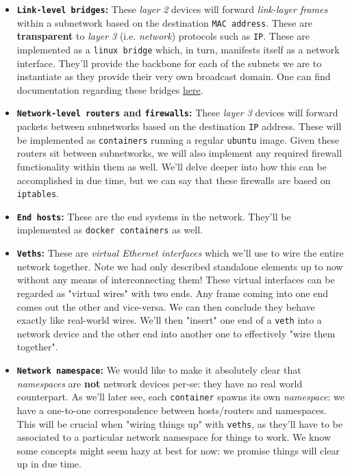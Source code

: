             \begin{itemize}
                \item \textbf{\texttt{Link-level bridges}:} These \textit{layer 2} devices will forward \textit{link-layer frames} within a subnetwork based on the destination \texttt{MAC address}. These are \textbf{transparent} to \textit{layer 3} (i.e. \textit{network}) protocols such as \texttt{IP}. These are implemented as a \texttt{linux bridge} which, in turn, manifests itself as a network interface. They'll provide the backbone for each of the subnets we are to instantiate as they provide their very own broadcast domain. One can find documentation regarding these bridges \href{https://wiki.linuxfoundation.org/networking/bridge}{here}.

                \item \textbf{\texttt{Network-level routers} and \texttt{firewalls}:} These \textit{layer 3} devices will forward packets between subnetworks based on the destination \texttt{IP} address. These will be implemented as \texttt{containers} running a regular \texttt{ubuntu} image. Given these routers sit between subnetworks, we will also implement any required firewall functionality within them as well. We'll delve deeper into how this can be accomplished in due time, but we can say that these firewalls are based on \texttt{iptables}.

                \item \textbf{\texttt{End hosts}:} These are the end systems in the network. They'll be implemented as \texttt{docker containers} as well.

                \item \textbf{\texttt{Veths}:} These are \textit{virtual Ethernet interfaces} which we'll use to wire the entire network together. Note we had only described standalone elements up to now without any means of interconnecting them! These virtual interfaces can be regarded as "virtual wires" with two ends. Any frame coming into one end comes out the other and vice-versa. We can then conclude they behave exactly like real-world wires. We'll then "insert" one end of a \texttt{veth} into a network device and the other end into another one to effectively "wire them together".

                \item \textbf{\texttt{Network namespace}:} We would like to make it absolutely clear that \textit{namespaces} are \textbf{not} network devices per-se: they have no real world counterpart. As we'll later see, each \texttt{container} spawns its own \textit{namespace}: we have a one-to-one correspondence between hosts/routers and namespaces. This will be crucial when "wiring things up" with \texttt{veths}, as they'll have to be associated to a particular network namespace for things to work. We know some concepts might seem hazy at best for now: we promise things will clear up in due time.
            \end{itemize}

